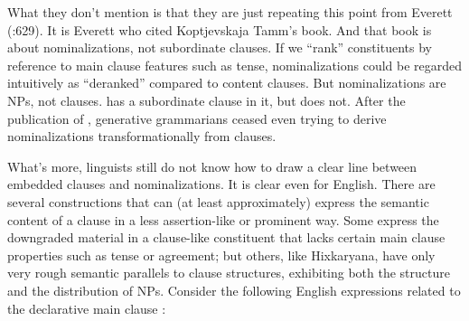 \documentclass[output=paper,colorlinks,citecolor=brown
]{langscibook}
\begin{document}
What they don't mention is that they are just repeating this point
from Everett (\citeyear{Everett05}:629). It is Everett who cited
Koptjevskaja Tamm's book. And that book is about nominalizations, not
subordinate clauses. If we ``rank'' constituents by reference to main
clause features such as tense, nominalizations could be regarded
intuitively as ``deranked'' compared to content clauses. But
nominalizations are NPs, not clauses.  has a subordinate clause in it, but
 does
not. After the publication of \citet{Chomsky70}, generative
grammarians ceased even trying to derive nominalizations
transformationally from clauses.

What's more, linguists still do not know how to draw a clear line between
embedded clauses and nominalizations. It is clear even for English.
There are several constructions that can (at least approximately)
express the semantic content of a clause in a less assertion-like
or prominent way.
Some express the downgraded material in a clause-like constituent
that lacks certain main clause properties such as tense or agreement;
but others, like Hixkaryana, have only very rough semantic parallels
to clause structures, exhibiting both the structure and the distribution
of NPs.  Consider the following English expressions related to the
declarative main clause :
\end{document}
